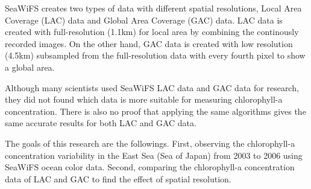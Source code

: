 SeaWiFS creates two types of data with different spatial resolutions, Local Area Coverage (LAC) data and Global Area Coverage (GAC) data. LAC data is created with full-resolution (1.1km) for local area by combining the continously recorded images. On the other hand, GAC data is created with low resolution (4.5km) subsampled from the full-resolution data with every fourth pixel to show a global area. 

Although many scientists used SeaWiFS LAC data and GAC data for research, they did not found which data is more suitable for measuring chlorophyll-a concentration. There is also no proof that applying the same algorithms gives the same accurate results for both LAC and GAC data. 

The goals of this research are the followings. First, observing the chlorophyll-a concentration variability in the East Sea (Sea of Japan) from 2003 to 2006 using SeaWiFS ocean color data. Second, comparing the chlorophyll-a concentration data of LAC and GAC to find the effect of spatial resolution.

